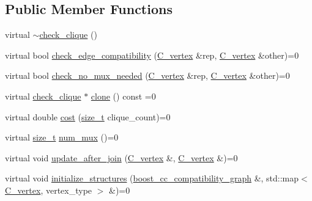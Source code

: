 \subsection*{Public Member Functions}
\begin{DoxyCompactItemize}
\item 
virtual \hyperlink{structcheck__clique_ab59f1c6c2117663f375f89fc98a145d7}{$\sim$check\+\_\+clique} ()
\item 
virtual bool \hyperlink{structcheck__clique_a5d5ad28e723a12d105f578360959ec53}{check\+\_\+edge\+\_\+compatibility} (\hyperlink{clique__covering__graph_8hpp_a9cb45047ea8c5ed95a8cfa90494345aa}{C\+\_\+vertex} \&rep, \hyperlink{clique__covering__graph_8hpp_a9cb45047ea8c5ed95a8cfa90494345aa}{C\+\_\+vertex} \&other)=0
\item 
virtual bool \hyperlink{structcheck__clique_ad6179189438c0cf415aa52e9c831e854}{check\+\_\+no\+\_\+mux\+\_\+needed} (\hyperlink{clique__covering__graph_8hpp_a9cb45047ea8c5ed95a8cfa90494345aa}{C\+\_\+vertex} \&rep, \hyperlink{clique__covering__graph_8hpp_a9cb45047ea8c5ed95a8cfa90494345aa}{C\+\_\+vertex} \&other)=0
\item 
virtual \hyperlink{structcheck__clique}{check\+\_\+clique} $\ast$ \hyperlink{structcheck__clique_a2a91d2e947216240ac91ea541fd63182}{clone} () const =0
\item 
virtual double \hyperlink{structcheck__clique_a81f12b024d09699d522ed560c0a96ff6}{cost} (\hyperlink{tutorial__fpt__2017_2intro_2sixth_2test_8c_a7c94ea6f8948649f8d181ae55911eeaf}{size\+\_\+t} clique\+\_\+count)=0
\item 
virtual \hyperlink{tutorial__fpt__2017_2intro_2sixth_2test_8c_a7c94ea6f8948649f8d181ae55911eeaf}{size\+\_\+t} \hyperlink{structcheck__clique_af124519bb9bb0f5476b38a20b8a7303b}{num\+\_\+mux} ()=0
\item 
virtual void \hyperlink{structcheck__clique_a9b4bfcf91eab9a68e1b75371ce372515}{update\+\_\+after\+\_\+join} (\hyperlink{clique__covering__graph_8hpp_a9cb45047ea8c5ed95a8cfa90494345aa}{C\+\_\+vertex} \&, \hyperlink{clique__covering__graph_8hpp_a9cb45047ea8c5ed95a8cfa90494345aa}{C\+\_\+vertex} \&)=0
\item 
virtual void \hyperlink{structcheck__clique_a8355d3ba6eb71d487ffc36d48274db73}{initialize\+\_\+structures} (\hyperlink{clique__covering__graph_8hpp_af47b1c28cf9a2c360afafb8d80582ce6}{boost\+\_\+cc\+\_\+compatibility\+\_\+graph} \&, std\+::map$<$ \hyperlink{clique__covering__graph_8hpp_a9cb45047ea8c5ed95a8cfa90494345aa}{C\+\_\+vertex}, vertex\+\_\+type $>$ \&)=0
\end{DoxyCompactItemize}


